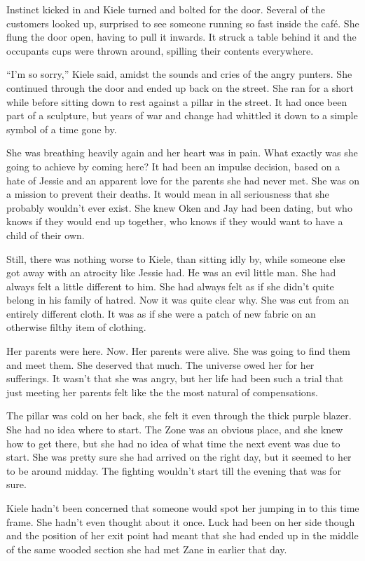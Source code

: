 Instinct kicked in and Kiele turned and bolted for the door.  Several of the customers looked up, surprised to see someone running so fast inside the café.  She flung the door open, having to pull it inwards.  It struck a table behind it and the occupants cups were thrown around, spilling their contents everywhere.

``I'm so sorry,'' Kiele said, amidst the sounds and cries of the angry punters.  She continued through the door and ended up back on the street.  She ran for a short while before sitting down to rest against a pillar in the street.  It had once been part of a sculpture, but years of war and change had whittled it down to a simple symbol of a time gone by.  

She was breathing heavily again and her heart was in pain.  What exactly was she going to achieve by coming here?  It had been an impulse decision, based on a hate of Jessie and an apparent love for the parents she had never met.  She was on a mission to prevent their deaths.  It would mean in all seriousness that she probably wouldn't ever exist.  She knew Oken and Jay had been dating, but who knows if they would end up together, who knows if they would want to have a child of their own.

Still, there was nothing worse to Kiele, than sitting idly by, while someone else got away with an atrocity like Jessie had.  He was an evil little man.  She had always felt a little different to him.  She had always felt as if she didn't quite belong in his family of hatred.  Now it was quite clear why.  She was cut from an entirely different cloth.  It was as if she were a patch of new fabric on an otherwise filthy item of clothing.

Her parents were here.  Now.  Her parents were alive.  She was going to find them and meet them.  She deserved that much.  The universe owed her for her sufferings.  It wasn't that she was angry, but her life had been such a trial that just meeting her parents felt like the the most natural of compensations.  

The pillar was cold on her back, she felt it even through the thick purple blazer.  She had no idea where to start.  The Zone was an obvious place, and she knew how to get there, but she had no idea of what time the next event was due to start.  She was pretty sure she had arrived on the right day, but it seemed to her to be around midday.  The fighting wouldn't start till the evening that was for sure.

Kiele hadn't been concerned that someone would spot her jumping in to this time frame.  She hadn't even thought about it once.  Luck had been on her side though and the position of her exit point had meant that she had ended up in the middle of the same wooded section she had met Zane in earlier that day.  


